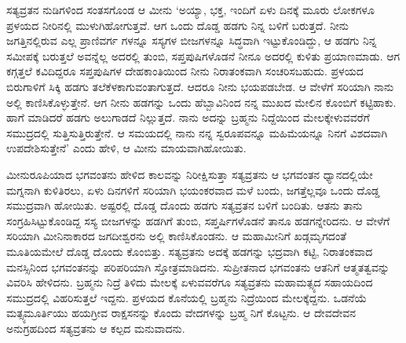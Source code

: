 ಸತ್ಯವ್ರತನ ನುಡಿಗಳಿಂದ ಸಂತಸಗೊಂಡ ಆ ಮೀನು ‘ಅಯ್ಯಾ, ಭಕ್ತ, ಇಂದಿಗೆ ಏಳು ದಿನಕ್ಕೆ ಮೂರು ಲೋಕಗಳೂ ಪ್ರಳಯದ ನೀರಿನಲ್ಲಿ ಮುಳುಗಿಹೋಗುತ್ತವೆ. ಆಗ ಒಂದು ದೊಡ್ಡ ಹಡಗು ನಿನ್ನ ಬಳಿಗೆ ಬರುತ್ತದೆ. ನೀನು ಜಗತ್ತಿನಲ್ಲಿರುವ ಎಲ್ಲ ಪ್ರಾಣಿವರ್ಗ ಗಳನ್ನೂ ಸಸ್ಯಗಳ ಬೀಜಗಳನ್ನೂ ಸಿದ್ಧವಾಗಿ ಇಟ್ಟುಕೊಂಡಿದ್ದು, ಆ ಹಡಗು ನಿನ್ನ ಸಮೀಪಕ್ಕೆ ಬರುತ್ತಲೆ ಅವನ್ನೆಲ್ಲ ಅದರಲ್ಲಿ ತುಂಬಿ, ಸಪ್ತಪುಷಿಗಳೊಡನೆ ನೀನೂ ಅದರಲ್ಲಿ ಕುಳಿತು ಪ್ರಯಾಣಮಾಡು. ಆಗ ಕಗ್ಗತ್ತಲೆ ಕವಿದಿದ್ದರೂ ಸಪ್ತಪುಷಿಗಳ ದೇಹಕಾಂತಿಯಿಂದ ನೀನು ನಿರಾತಂಕವಾಗಿ ಸಂಚರಿಸಬಹುದು. ಪ್ರಳಯದ ಬಿರುಗಾಳಿಗೆ ಸಿಕ್ಕಿ ಹಡಗು ತಲೆಕೆಳಕಾಗುವಂತಾಗುತ್ತದೆ. ಆದರೂ ನೀನು ಭಯಪಡಬೇಡ. ಆ ವೇಳೆಗೆ ಸರಿಯಾಗಿ ನಾನು ಅಲ್ಲಿ ಕಾಣಿಸಿಕೊಳ್ಳುತ್ತೇನೆ. ಆಗ ನೀನು ಹಡಗನ್ನು ಒಂದು ಹೆಬ್ಬಾವಿನಿಂದ ನನ್ನ ಮುಖದ ಮೇಲಿನ ಕೊಂಬಿಗೆ ಕಟ್ಟಿಹಾಕು. ಹಾಗೆ ಮಾಡಿದರೆ ಹಡಗು ಅಲುಗಾಡದೆ ನಿಲ್ಲುತ್ತದೆ. ನಾನು ಅದನ್ನು ಬ್ರಹ್ಮನು ನಿದ್ದೆಯಿಂದ ಮೇಲಕ್ಕೇಳುವವರೆಗೆ ಸಮುದ್ರದಲ್ಲಿ ಸುತ್ತಿಸುತ್ತಿರುತ್ತೇನೆ. ಆ ಸಮಯದಲ್ಲಿ ನಾನು ನನ್ನ ಸ್ವರೂಪವನ್ನೂ ಮಹಿಮೆಯನ್ನೂ ನಿನಗೆ ವಿಶದವಾಗಿ ಉಪದೇಶಿಸುತ್ತೇನೆ’ ಎಂದು ಹೇಳಿ, ಆ ಮೀನು ಮಾಯವಾಗಿಹೋಯಿತು.

ಮೀನುರೂಪಿಯಾದ ಭಗವಂತನು ಹೇಳಿದ ಕಾಲವನ್ನು ನಿರೀಕ್ಷಿಸುತ್ತಾ ಸತ್ಯವ್ರತನು ಆ ಭಗವಂತನ ಧ್ಯಾನದಲ್ಲಿಯೇ ಮಗ್ನನಾಗಿ ಕುಳಿತಿರಲು, ಏಳು ದಿನಗಳಿಗೆ ಸರಿಯಾಗಿ ಭಯಂಕರವಾದ ಮಳೆ ಬಂದು, ಜಗತ್ತೆಲ್ಲವೂ ಒಂದು ದೊಡ್ಡ ಸಮುದ್ರವಾಗಿ ಹೋಯಿತು. ಅಷ್ಟರಲ್ಲಿ ದೊಡ್ಡ ದೊಂದು ಹಡಗು ಸತ್ಯವ್ರತನ ಬಳಿಗೆ ಬಂದಿತು. ಆತನು ತಾನು ಸಂಗ್ರಹಿಸಿಟ್ಟುಕೊಂಡಿದ್ದ ಸಸ್ಯ ಬೀಜಗಳನ್ನು ಹಡಗಿಗೆ ತುಂಬಿ, ಸಪ್ತರ್ಷಿಗಳೊಡನೆ ತಾನೂ ಹಡಗನ್ನೇರಿದನು. ಆ ವೇಳೆಗೆ ಸರಿಯಾಗಿ ಮೀನಿನಾಕಾರದ ಜಗದೀಶ್ವರನು ಅಲ್ಲಿ ಕಾಣಿಸಿಕೊಂಡನು. ಆ ಮಹಾಮೀನಿಗೆ ಖಡ್ಗಮೃಗದಂತೆ ಮೂತಿಯಮೇಲೆ ದೊಡ್ಡ ದೊಂದು ಕೊಂಬಿತ್ತು. ಸತ್ಯವ್ರತನು ಅದಕ್ಕೆ ಹಡಗನ್ನು ಭದ್ರವಾಗಿ ಕಟ್ಟಿ, ನಿರಾತಂಕವಾದ ಮನಸ್ಸಿನಿಂದ ಭಗವಂತನನ್ನು ಪರಿಪರಿಯಾಗಿ ಸ್ತೋತ್ರಮಾಡಿದನು. ಸುಪ್ರೀತನಾದ ಭಗವಂತನು ಆತನಿಗೆ ಆತ್ಮತತ್ವವನ್ನು ವಿವರಿಸಿ ಹೇಳಿದನು. ಬ್ರಹ್ಮನು ನಿದ್ರೆ ತಿಳಿದು ಮೇಲಕ್ಕೆ ಏಳುವವರೆಗೂ ಸತ್ಯವ್ರತನು ಮಹಾಮತ್ಸ್ಯದ ಸಹಾಯದಿಂದ ಸಮುದ್ರದಲ್ಲಿ ವಿಹರಿಸುತ್ತಲೆ ಇದ್ದನು. ಪ್ರಳಯದ ಕೊನೆಯಲ್ಲಿ ಬ್ರಹ್ಮನು ನಿದ್ರೆಯಿಂದ ಮೇಲಕ್ಕೆದ್ದನು. ಒಡನೆಯೆ ಮತ್ಸ್ಯಮೂರ್ತಿಯು ಹಯಗ್ರೀವ ರಾಕ್ಷಸನನ್ನು ಕೊಂದು ವೇದಗಳನ್ನು ಬ್ರಹ್ಮ ನಿಗೆ ಕೊಟ್ಟನು. ಆ ದೇವದೇವನ ಅನುಗ್ರಹದಿಂದ ಸತ್ಯವ್ರತನು ಆ ಕಲ್ಪದ ಮನುವಾದನು.

